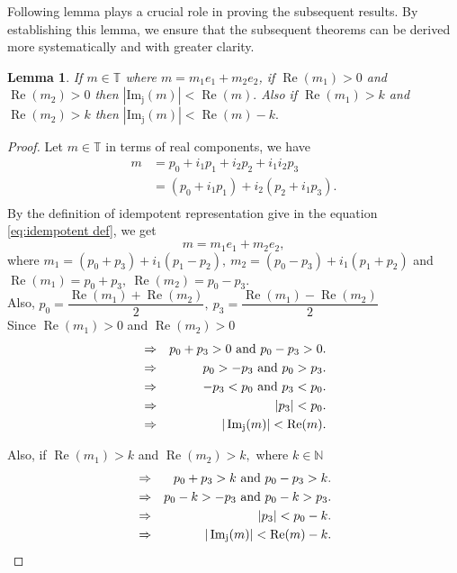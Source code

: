 \documentclass[a4paper,12pt]{article}
\newtheorem{lemma} [theorem]{Lemma}
\theoremstyle{remark}
\begin{document}
\noindent Following lemma plays a crucial role in proving the subsequent results. By establishing this lemma, we ensure that the subsequent theorems can be derived more systematically and with greater clarity.
\begin{lemma}
	If $m \in \mathbb{T}$ where $m=m_1e_1+m_2e_2$, if	$\operatorname{Re}(m_1)>0$ and  $\operatorname{Re}(m_2)  >0$ then  $|\operatorname{Im_j}(m)|<\operatorname{Re}(m).$ Also if $\operatorname{Re}(m_1)>k$ and  $\operatorname{Re}(m_2)  >k$ then   $|\operatorname{Im_j}(m)|<\operatorname{Re}(m)-k.$
	
\end{lemma}
\begin{proof}
	
	Let $m \in \mathbb{T}$ in terms of real components, we have
	\begin{equation}
	\begin{split}
	m&= p_0+i_1p_1+ i_2p_2+i_1i_2p_3\\
	&=(p_0+i_1p_1) +i_2( p_2+i_1p_3).\\
	\end{split}
	\end{equation}
    By the definition of idempotent representation give in the equation \eqref{eq:idempotent def}, we get
    \begin{equation}
        m=m_1e_1+m_2e_2,
    \end{equation}
	where $m_1= (p_0+p_3) +i_1(p_1-p_2),~m_2= (p_0-p_3) +i_1(p_1+p_2)$
 and
    $\operatorname{Re}(m_1)= p_0+p_3, ~\operatorname{Re}(m_2)= p_0-p_3. $ \\
    Also, $p_0=\dfrac{\operatorname{Re}(m_1)+\operatorname{Re}(m_2)}{2},~p_3=\dfrac{\operatorname{Re}(m_1)-\operatorname{Re}(m_2)}{2}$\\

    
	\noindent Since
	$\operatorname{Re}(m_1)>0$ and  $\operatorname{Re}(m_2)  >0$
	\begin{eqnarray}
	&\Rightarrow & p_0+p_3 >0 ~\text{and}~ p_0-p_3 >0.\\ \notag 
    &\Rightarrow & p_0 >-p_3 ~\text{and}~ p_0>p_3.\\ \notag 
     &\Rightarrow &-p_3 < p_0 ~\text{and}~ p_3< p_0 .\\ \notag 	
	&	\Rightarrow & ~ |p_3|<p_0.\label{eq:re(alpha)g0}\\ \notag 
	&\Rightarrow&|\operatorname{Im_j}(m)|<\operatorname{Re}(m).
	\end{eqnarray}
	
\noindent Also, if 
	$\operatorname{Re}(m_1)>k$ and  $\operatorname{Re}(m_2)  >k,$ where $k\in \mathbb{N}$
	\begin{eqnarray}
	&\Rightarrow & p_0+p_3 >k ~\text{and}~ p_0-p_3 >k.\\ \notag     
	&\Rightarrow & p_0-k >-p_3 ~\text{and}~ p_0-k >p_3.\\ \notag 
	&	\Rightarrow& ~ |p_3|<p_0-k.\label{eq:re(alpha)g01}\\ \notag 
	&\Rightarrow&|\operatorname{Im_j}(m)|<\operatorname{Re}(m)-k.
	\end{eqnarray}
	
	

\end{proof}
\end{document}
